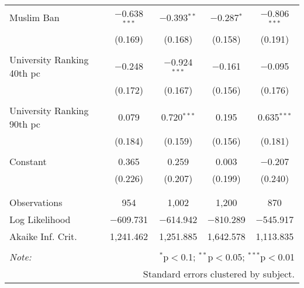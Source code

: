 \begin{table}[!htbp]
\begin{tabular}{@{\extracolsep{5pt}}lcccc}
 Muslim Ban & $-$0.638$^{***}$ & $-$0.393$^{**}$ & $-$0.287$^{*}$ & $-$0.806$^{***}$ \\ 
  & (0.169) & (0.168) & (0.158) & (0.191) \\ 
  & & & & \\ 
 University Ranking 40th pc & $-$0.248 & $-$0.924$^{***}$ & $-$0.161 & $-$0.095 \\ 
  & (0.172) & (0.167) & (0.156) & (0.176) \\ 
  & & & & \\ 
 University Ranking 90th pc & 0.079 & 0.720$^{***}$ & 0.195 & 0.635$^{***}$ \\ 
  & (0.184) & (0.159) & (0.156) & (0.181) \\ 
  & & & & \\ 
 Constant & 0.365 & 0.259 & 0.003 & $-$0.207 \\ 
  & (0.226) & (0.207) & (0.199) & (0.240) \\ 
  & & & & \\ 
\hline \\[-1.8ex] 
Observations & 954 & 1,002 & 1,200 & 870 \\ 
Log Likelihood & $-$609.731 & $-$614.942 & $-$810.289 & $-$545.917 \\ 
Akaike Inf. Crit. & 1,241.462 & 1,251.885 & 1,642.578 & 1,113.835 \\ 
\hline 
\hline \\[-1.8ex] 
\textit{Note:}  & \multicolumn{4}{r}{$^{*}$p$<$0.1; $^{**}$p$<$0.05; $^{***}$p$<$0.01} \\ 
 & \multicolumn{4}{r}{Standard errors clustered by subject.} \\ 
\end{tabular} 
\end{table} 
